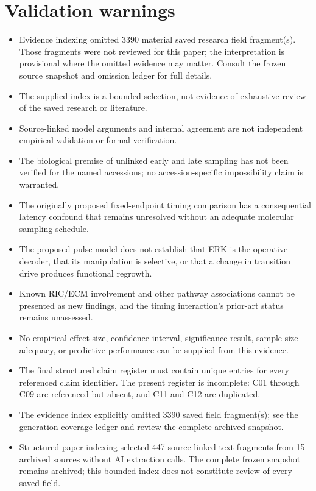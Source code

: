 \documentclass[11pt]{article}
\begin{document}
\section*{Validation warnings}
\begin{itemize}
\item Evidence indexing omitted 3390 material saved research field fragment(s). Those fragments were not reviewed for this paper; the interpretation is provisional where the omitted evidence may matter. Consult the frozen source snapshot and omission ledger for full details.
\item The supplied index is a bounded selection, not evidence of exhaustive review of the saved research or literature.
\item Source-linked model arguments and internal agreement are not independent empirical validation or formal verification.
\item The biological premise of unlinked early and late sampling has not been verified for the named accessions; no accession-specific impossibility claim is warranted.
\item The originally proposed fixed-endpoint timing comparison has a consequential latency confound that remains unresolved without an adequate molecular sampling schedule.
\item The proposed pulse model does not establish that ERK is the operative decoder, that its manipulation is selective, or that a change in transition drive produces functional regrowth.
\item Known RIC/ECM involvement and other pathway associations cannot be presented as new findings, and the timing interaction's prior-art status remains unassessed.
\item No empirical effect size, confidence interval, significance result, sample-size adequacy, or predictive performance can be supplied from this evidence.
\item The final structured claim register must contain unique entries for every referenced claim identifier. The present register is incomplete: C01 through C09 are referenced but absent, and C11 and C12 are duplicated.
\item The evidence index explicitly omitted 3390 saved field fragment(s); see the generation coverage ledger and review the complete archived snapshot.
\item Structured paper indexing selected 447 source-linked text fragments from 15 archived sources without AI extraction calls. The complete frozen snapshot remains archived; this bounded index does not constitute review of every saved field.

\end{itemize}
\end{document}

